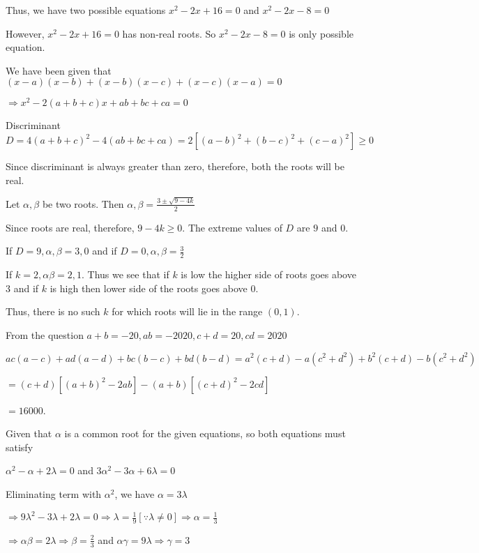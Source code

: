   Thus, we have two possible equations $x^2 - 2x + 16 = 0$ and $x^2 - 2x - 8 = 0$

  However, $x^2 - 2x + 16 = 0$ has non-real roots. So $x^2 - 2x - 8 = 0$ is only possible equation.
\item We have been given that $(x - a)(x - b) + (x - b)(x - c) + (x - c)(x - a) = 0$

  $\Rightarrow x^2 - 2(a + b + c)x + ab + bc + ca = 0$

  Discriminant $D = 4(a + b + c)^2 - 4(ab + bc + ca) = 2[(a - b)^2 + (b - c)^2 + (c - a)^2]\geq 0$

  Since discriminant is always greater than zero, therefore, both the roots will be real.
\item Let $\alpha, \beta$ be two roots. Then $\alpha, \beta = \frac{3\pm \sqrt{9 - 4k}}{2}$

  Since roots are real, therefore, $9 - 4k \geq 0$. The extreme values of $D$ are $9$ and $0$.

  If $D = 9, \alpha, \beta = 3, 0$ and if $D = 0, \alpha, \beta = \frac{3}{2}$

  If $k = 2, \alpha\beta = 2, 1$. Thus we see that if $k$ is low the higher side of roots goes above $3$ and
  if $k$ is high then lower side of the roots goes above $0$.

  Thus, there is no such $k$ for which roots will lie in the range $(0, 1)$.
\item From the question $a + b = -20, ab = -2020, c + d = 20, cd = 2020$

  $ac(a - c) + ad(a - d) + bc(b - c) + bd(b - d) = a^2(c + d) - a\left(c^2 + d^2\right) + b^2(c + d) - b(c^2
  + d^2)$

  $= (c + d)\left[\left(a + b\right)^2 - 2ab\right] - (a + b)\left[\left(c + d\right)^2 - 2cd\right]$

  $= 16000$.
\item Given that $\alpha$ is a common root for the given equations, so both equations must satisfy

  $\alpha^2 - \alpha + 2\lambda = 0$ and $3\alpha^2 - 3\alpha + 6\lambda = 0$

  Eliminating term with $\alpha^2$, we have $\alpha = 3\lambda$

  $\Rightarrow 9\lambda^2 - 3\lambda + 2\lambda = 0\Rightarrow \lambda = \frac{1}{9}[\because \lambda\neq
    0]\Rightarrow \alpha = \frac{1}{3}$

  $\Rightarrow \alpha\beta = 2\lambda \Rightarrow \beta = \frac{2}{3}$ and $\alpha\gamma = 9\lambda
  \Rightarrow \gamma = 3$


